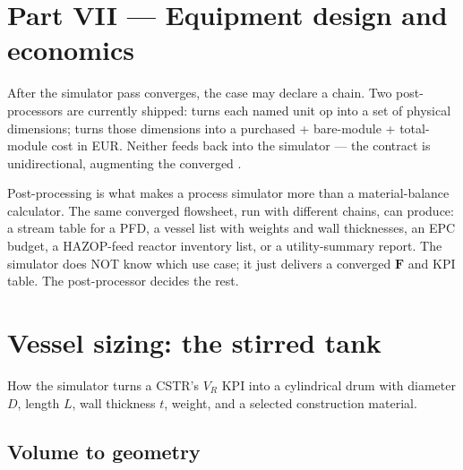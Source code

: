 \documentclass[11pt,a4paper]{article}
\newcommand{\Fv}{\mathbf{F}}
\begin{document}
\clearpage
\section*{Part VII --- Equipment design and economics}
{}

\setcounter{section}{0}

\noindent After the simulator pass converges, the case may declare a
 chain. Two post-processors are currently
shipped:  turns each named unit op into a set of
physical dimensions;  turns those dimensions into a
purchased + bare-module + total-module cost in EUR. Neither feeds back
into the simulator --- the contract is unidirectional, augmenting
the converged .

\begin{intuition}
Post-processing is what makes a process simulator more than a
material-balance calculator. The same converged flowsheet, run with
different  chains, can produce: a stream table for a
PFD, a vessel list with weights and wall thicknesses, an EPC budget,
a HAZOP-feed reactor inventory list, or a utility-summary report.
The simulator does NOT know which use case; it just delivers a
converged $\Fv$ and KPI table. The post-processor decides the rest.
\end{intuition}

\section{Vessel sizing: the stirred tank}\label{ch:size-vessel}

\begin{whatyoulllearn}
How the simulator turns a CSTR's $V_R$ KPI into a cylindrical drum
with diameter $D$, length $L$, wall thickness $t$, weight, and a
selected construction material.
\end{whatyoulllearn}

\subsection{Volume to geometry}
\end{document}

